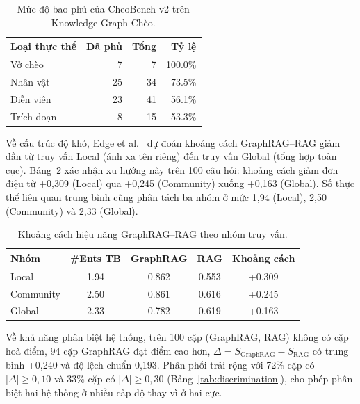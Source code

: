 \begin{table}[h]
\centering
\caption{Mức độ bao phủ của CheoBench v2 trên Knowledge Graph Chèo.}
\label{tab:coverage_entity}
\begin{tabular}{lrrr}
\hline
\textbf{Loại thực thể} & \textbf{Đã phủ} & \textbf{Tổng} & \textbf{Tỷ lệ} \\
\hline
Vở chèo       &  7 &  7 & 100.0\% \\
Nhân vật      & 25 & 34 &  73.5\% \\
Diễn viên     & 23 & 41 &  56.1\% \\
Trích đoạn    &  8 & 15 &  53.3\% \\
\hline
\end{tabular}
\end{table}

Về cấu trúc độ khó, Edge et al.~\cite{edge2024graphrag} dự đoán khoảng cách GraphRAG--RAG giảm dần từ truy vấn Local (ánh xạ tên riêng) đến truy vấn Global (tổng hợp toàn cục). Bảng~\ref{tab:construct_validity} xác nhận xu hướng này trên 100 câu hỏi: khoảng cách giảm đơn điệu từ +0,309 (Local) qua +0,245 (Community) xuống +0,163 (Global). Số thực thể liên quan trung bình cũng phân tách ba nhóm ở mức 1,94 (Local), 2,50 (Community) và 2,33 (Global).

\begin{table}[h]
\centering
\caption{Khoảng cách hiệu năng GraphRAG--RAG theo nhóm truy vấn.}
\label{tab:construct_validity}
\begin{tabular}{lcccc}
\hline
\textbf{Nhóm} & \textbf{\#Ents TB} & \textbf{GraphRAG} & \textbf{RAG} & \textbf{Khoảng cách} \\
\hline
Local      & 1.94 & 0.862 & 0.553 & +0.309 \\
Community  & 2.50 & 0.861 & 0.616 & +0.245 \\
Global     & 2.33 & 0.782 & 0.619 & +0.163 \\
\hline
\end{tabular}
\end{table}

Về khả năng phân biệt hệ thống, trên 100 cặp (GraphRAG, RAG) không có cặp hoà điểm, 94 cặp GraphRAG đạt điểm cao hơn, $\Delta = S_{\text{GraphRAG}} - S_{\text{RAG}}$ có trung bình +0,240 và độ lệch chuẩn 0,193. Phân phối trải rộng với 72\% cặp có $|\Delta| \geq 0{,}10$ và 33\% cặp có $|\Delta| \geq 0{,}30$ (Bảng~\ref{tab:discrimination}), cho phép phân biệt hai hệ thống ở nhiều cấp độ thay vì ở hai cực.

